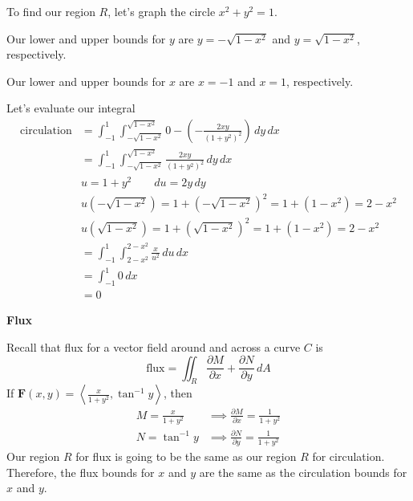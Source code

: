 \documentclass{article}
\newcommand{\lrp}[1]{\left( #1 \right)}
\newcommand{\lra}[1]{\left\langle #1 \right\rangle}
\newcommand{\F}[0]{\mathbf{F}}
\begin{document}
To find our region $R$, let's graph the circle $x^2+y^2=1$.
\begin{center}
\end{center}
Our lower and upper bounds for $y$ are $y=-\sqrt{1-x^2}$ and $y=\sqrt{1-x^2}$, respectively.

Our lower and upper bounds for $x$ are $x=-1$ and $x=1$, respectively.

Let's evaluate our integral
\begin{align*}
    \text{circulation}&=\int_{-1}^{1}\int_{-\sqrt{1-x^2}}^{\sqrt{1-x^2}} 0-\lrp{-\frac{2xy}{(1+y^2)^2}}\,dy\,dx\\
    &=\int_{-1}^{1}\int_{-\sqrt{1-x^2}}^{\sqrt{1-x^2}}\frac{2xy}{(1+y^2)^2}\,dy\,dx\\
    &u=1+y^2\hspace{2em}du=2y\,dy\\
    &u\lrp{-\sqrt{1-x^2}}=1+\lrp{-\sqrt{1-x^2}}^2=1+\lrp{1-x^2}=2-x^2\\
    &u\lrp{\sqrt{1-x^2}}=1+\lrp{\sqrt{1-x^2}}^2=1+\lrp{1-x^2}=2-x^2\\
    &=\int_{-1}^1 \int_{2-x^2}^{2-x^2}\frac{x}{u^2}\,du\,dx\\
    &=\int_{-1}^1 0\,dx\tag{same upper and lower bounds}\\
    &=0
\end{align*}

\newpage
{}
{}\textbf{Flux}

Recall that flux for a vector field around and across a curve $C$ is
\begin{equation*}
   \text{flux} = \iint_R \frac{\partial M}{\partial x} + \frac{\partial N}{\partial y}\,dA
\end{equation*}
If $\displaystyle\F(x,y)=\lra{\frac{x}{1+y^2},\tan^{-1}y}$, then
\begin{align*}
    M=\frac{x}{1+y^2}&\implies \frac{\partial M}{\partial x}=\frac{1}{1+y^2}\\
    N=\tan^{-1}y&\implies \frac{\partial N}{\partial y}=\frac{1}{1+y^2}
\end{align*}
Our region $R$ for flux is going to be the same as our region $R$ for circulation. Therefore, the flux bounds for $x$ and $y$ are the same as the circulation bounds for $x$ and $y$.
\end{document}
